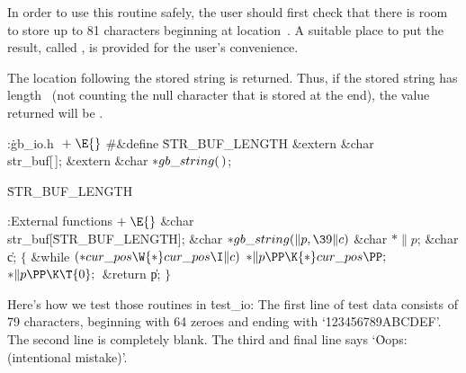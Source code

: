 In order to use this routine safely, the user should first check that
there is room to store up to 81 characters beginning at location~.
A suitable place to put the result, called , is provided
for the user's convenience.

The location following the stored string is returned. Thus, if the
stored string has length~ (not counting the null character that is
stored at the end), the value returned will be .

\Y\B\4:\.{gb\_io.h }\X${}\mathrel+\E{}$\6
\8\#\&{define} \.{STR\_BUF\_LENGTH}\5\6
\&{extern} \&{char} \\{str\_buf}[\,];\6
\&{extern} \&{char} ${}{*}\\{gb\_string}(\,){}$;%
\par
\fi

\B\D\.{STR\_BUF\_LENGTH}\5
\par
\Y\B\4:External functions\X${}\mathrel+\E{}$\6
\&{char} \\{str\_buf}[\.{STR\_BUF\_LENGTH}];\7
\1\1\&{char} ${}{*}\\{gb\_string}(\|p,\39\|c){}$\6
\&{char} ${}{*}\|p{}$;\6
\&{char} \|c;\2\2\6
${}\{{}$\1\6
\&{while} ${}({*}\\{cur\_pos}\W{*}\\{cur\_pos}\I\|c){}$\1\5
${}{*}\|p\PP\K{*}\\{cur\_pos}\PP;{}$\2\6
${}{*}\|p\PP\K\T{0};{}$\6
\&{return} \|p;\6
\4${}\}{}$\2\par
\fi

Here's how we test those routines in \.{test\_io}: The first line of test
data consists of 79 characters, beginning with 64 zeroes and ending with
`\.{123456789ABCDEF}'. The second line is completely blank. The third
and final line says `\.{Oops:(intentional mistake)}'.

